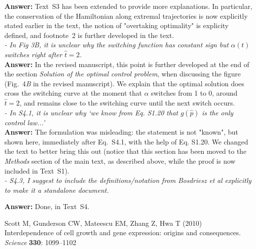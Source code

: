 \documentclass[11pt]{article}
\begin{document}
\noindent\textbf{Answer:} Text~S3 has been extended to provide more explanations. In particular, the conservation of the Hamiltonian along extremal trajectories is now explicitly stated earlier in the text, the notion of "overtaking optimality" is explicity defined, and footnote~2 is further developed in the text.\\


\textit{- In Fig 3B, it is unclear why the switching function has constant sign but $\alpha(t)$ switches right after $\hat{t}=2$.} \\

\noindent\textbf{Answer:} In the revised manuscript, this point is further developed at the end of the section \textit{Solution of the optimal control problem}, when discussing the figure (Fig.~4\textit{B} in the revised manuscript). We explain that the optimal solution does cross the switching curve at the moment that $\alpha$ switches from 1 to 0, around $\hat{t}=2$, and remains close to the switching curve until the next switch occurs.   \\


\textit{- In S4.1, it is unclear why ‘we know from Eq. S1.20 that $g(\hat{p})$ is the only control law...'} \\

\noindent\textbf{Answer:} The formulation was misleading: the statement is not "known", but shown here, immediately after Eq.~S4.1, with the help of Eq. S1.20. We changed the text to better bring this out (notice that this section has been moved to the \textit{Methods} section of the main text, as described above, while the proof is now included in Text~S1). \\


\textit{- S4.3, I suggest to include the definitions/notation from Bosdriesz et al explicitly to make it a standalone document.}

\noindent\textbf{Answer:} Done, in Text~S4. \\




\begin{thebibliography}{10}

Scott M, Gunderson CW, Mateescu EM, Zhang Z, Hwa T (2010) {Interdependence of
  cell growth and gene expression: origins and consequences.} {\it Science\/}
  {\bf 330}: 1099--1102


\end{thebibliography}
\end{document}
